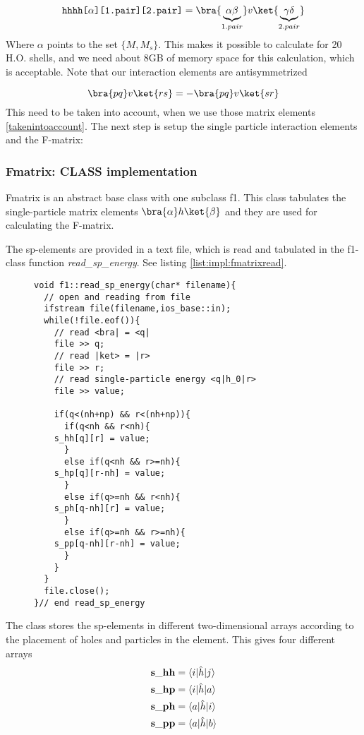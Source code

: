 \begin{equation}
  \texttt{hhhh[$\alpha$][1.pair][2.pair]} = \bra{\underbrace{\alpha \beta}_{1.pair}} v \ket{\underbrace{\gamma \delta}_{2.pair}}
  \label{takenintoaccount}
\end{equation}
%
Where $\alpha$ points to the set $\{M,M_s\}$. This makes it possible to calculate for 20 H.O. shells, and we need about 8GB of memory space for this calculation, which is acceptable. Note that our interaction elements are antisymmetrized

\begin{equation*}
  \bra{pq}v\ket{rs} = -\bra{pq}v\ket{sr}
\end{equation*}
%
This need to be taken into account, when we use those matrix elements \ref{takenintoaccount}.  
%
The next step is setup the single particle interaction elements and the F-matrix:

\subsubsection{Fmatrix: CLASS implementation}

Fmatrix is an abstract base class with one subclass f1. This class tabulates the single-particle matrix elements $\bra{\alpha}h\ket{\beta}$ and they are used for calculating the F-matrix.

The sp-elements are provided in a text file, which is read and tabulated in the f1-class function \emph{read\_sp\_energy}. See listing \ref{list:impl:fmatrixread}. 
\begin{figure}[htb!]
\begin{lstlisting}[label={list:impl:fmatrixread},caption={Illustration of the implemented Fmatrix class function read\_sp\_energy. See the text for description.}]
void f1::read_sp_energy(char* filename){
  // open and reading from file
  ifstream file(filename,ios_base::in);
  while(!file.eof()){ 
    // read <bra| = <q|
    file >> q;
    // read |ket> = |r>
    file >> r; 
    // read single-particle energy <q|h_0|r>
    file >> value;
    
    if(q<(nh+np) && r<(nh+np)){
      if(q<nh && r<nh){
	s_hh[q][r] = value;
      }
      else if(q<nh && r>=nh){
	s_hp[q][r-nh] = value;
      }
      else if(q>=nh && r<nh){
	s_ph[q-nh][r] = value;
      }
      else if(q>=nh && r>=nh){
	s_pp[q-nh][r-nh] = value;
      }
    }
  }   
  file.close(); 
}// end read_sp_energy
\end{lstlisting}
\end{figure}
The class stores the sp-elements in different two-dimensional arrays according to the placement of holes and particles in the element. This gives four different arrays
\begin{align}  
{\bf s\_{hh}}&=\langle i|\hat{h}|j\rangle\nonumber\\
{\bf s\_{hp}}&=\langle i|\hat{h}|a\rangle\nonumber\\
{\bf s\_{ph}}&=\langle a|\hat{h}|i\rangle\nonumber\\
{\bf s\_{pp}}&=\langle a|\hat{h}|b\rangle
\end{align}

